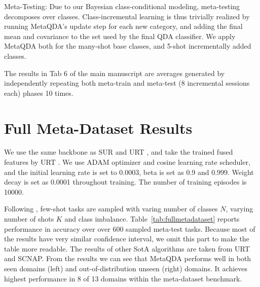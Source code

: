 \documentclass[10pt,twocolumn,letterpaper]{article}
\begin{document}
Meta-Testing: Due to our Bayesian class-conditional modeling, meta-testing decomposes over classes. Class-incremental learning is thus trivially realized by running MetaQDA's update step for each new category, and adding the final mean and covariance to the set used by the final QDA classifier. We apply MetaQDA both for the many-shot base classes, and 5-shot incrementally added classes.

The results in Tab 6 of the main manuscript are averages generated by independently repeating both meta-train and meta-test (8 incremental sessions each) phases 10 times.

\section{Full Meta-Dataset Results}\label{sec:fullMetaDataset}

We use the same backbone as SUR \cite{dvornik2020selecting} and URT \cite{liu2020universal}, and take the trained fused features by URT \cite{liu2020universal}.
We use ADAM optimizer and cosine learning rate scheduler, and the initial learning rate is set to 0.0003, beta is set as 0.9 and 0.999. Weight decay is set as 0.0001 throughout training. The number of training episodes is 10000.

Following \cite{triantafillou2019meta}, few-shot tasks are sampled with varing number of classes $N$, varying number of shots $K$ and class imbalance. Table~\ref{tab:fullmetadataset} reports performance in accuracy over  over 600 sampled meta-test tasks. Because most of the results have very similar confidence interval, we omit this part to make the table more readable.
The results of other SotA algorithms are taken from URT \cite{liu2020universal} and SCNAP\cite{bateni2020improved}. From the results we can see that MetaQDA performs well in both seen domains (left) and out-of-distribution unseen (right) domains. It achieves highest performance in 8 of 13 domains within the meta-dataset benchmark. 
\end{document}
